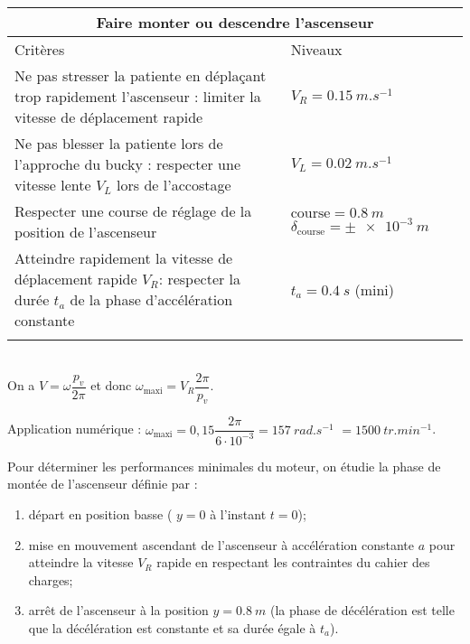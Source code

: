 \begin{multicols}{2}
\ifprof
\else
\begin{center}
\begin{tabular}{|p{.6\linewidth}|p{.3\linewidth}|}
\hline
\multicolumn{2}{|c|}{Faire monter ou descendre l'ascenseur} \\
\hline
Critères & Niveaux \\
\hline
Ne pas stresser la patiente en déplaçant trop rapidement l’ascenseur : limiter la vitesse de
déplacement rapide & $V_R=\SI{0,15}{m.s^{-1}}$ \\ \hline
Ne pas blesser la patiente lors de l’approche du bucky : respecter une vitesse lente $V_L$ lors de
l’accostage & $V_L=\SI{0,02}{m.s^{-1}}$ \\ \hline 
Respecter une course de réglage de la position de l’ascenseur & $\text{course} = \SI{0,8}{m}$  $\delta_{\text{course}}=\pm\SI{e-3}{m}$ \\ \hline
Atteindre rapidement la vitesse de déplacement rapide $V_R$: respecter
la durée $t_a$ de la phase d’accélération constante & $t_a=\SI{0,4}{s}$ (mini) \\
 \\ \hline
\end{tabular}
\end{center}


\fi

\ifprof
\begin{corrige}~\\
On a $V=\omega \dfrac{p_v}{2\pi}$ et donc $\omega_{\text{maxi}} = V_R\dfrac{2\pi}{p_v}$.

Application numérique : $\omega_{\text{maxi}} = 0,15\dfrac{2\pi}{6\cdot 10^{-3}}=\SI{157}{rad.s^{-1}}$ $=\SI{1500}{tr.min^{-1}}$.
\end{corrige}
\else
\fi

\ifprof
\else
Pour déterminer les performances minimales du moteur, on étudie la phase de montée de l’ascenseur définie par :
\begin{enumerate}
\item départ en position basse ( $y=0$ à l’instant $t=0$);
\item mise en mouvement ascendant de l’ascenseur à accélération constante $a$ pour atteindre la vitesse $V_R$ rapide en respectant les contraintes du cahier des charges;
\item arrêt de l’ascenseur à la position $y=\SI{0,8}{m}$ (la phase de décélération est telle que la décélération est constante et sa durée égale à $t_a$).
\end{enumerate}
\fi


\end{multicols}
